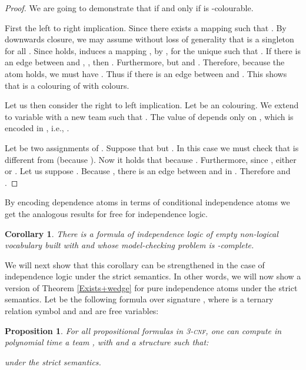\documentclass{article}
\theoremstyle{plain}
\newtheorem{corollary}[theorem]{Corollary}
\newtheorem{proposition}[theorem]{Proposition}
\theoremstyle{definition}
\newcommand{\pb}[1]{\textsc{#1}}
\begin{document}
\begin{proof}
	
	
	We are going to demonstrate that  if and only if  is -colourable.
	
	First the left to right implication. Since  there exists  a mapping   such that .  By downwards closure, we may assume without loss of generality that  is a singleton for all .
Since   holds,   induces a mapping  , by 
, for the unique  such that . If there is an edge between  and , , then . Furthermore,  but  and . Therefore, because the atom   holds,  we must have . Thus   if there is an edge between  and .  This shows that  is a colouring of  with  colours.
	
	Let us then consider the right to left implication. Let  be an  colouring. We extend  to variable  with a new team  such that . The value of  depends only on , which is encoded in , i.e., .
	
	 Let  be two assignments of . Suppose that  but . In this case we must check that  is different from  (because ). Now it holds that  because . Furthermore, since , either  or . Let us suppose . Because , there is an edge between  and  in . Therefore  and .
	\end{proof}

By encoding dependence atoms in terms of conditional independence atoms we get the analogous results for free for independence logic.
\begin{corollary}
There is a formula  of independence logic of empty non-logical vocabulary built with  and  whose model-checking problem is  -complete.
 
\end{corollary}
We will next show that this corollary can be strengthened in the case of independence logic under the strict semantics. In other words, we will now show a  version of Theorem \ref{Exists+wedge}  for pure independence atoms under the strict semantics. Let  be the following formula over signature , where  is a ternary relation symbol and   and  are free variables:



\begin{proposition}\label{StrictInd}
For all propositional formulas  in 3-\pb{cnf}, one can compute in polynomial time a  team , with  and a structure  such that:


under the strict semantics.
\end{proposition}
\end{document}
